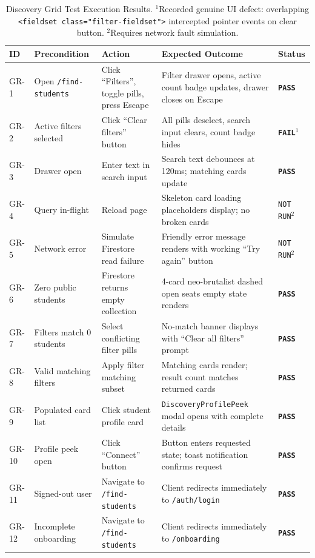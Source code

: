 \documentclass[11pt,letterpaper]{article}
\begin{document}
\begin{table}[h!]
\centering
\small
\begin{tabularx}{\textwidth}{p{1.0cm} p{2.2cm} Y Y p{1.8cm}}
\toprule
\textbf{ID} & \textbf{Precondition} & \textbf{Action} & \textbf{Expected Outcome} & \textbf{Status} \\
\midrule
GR-1 & Open \texttt{/find-students} & Click ``Filters'', toggle pills, press Escape & Filter drawer opens, active count badge updates, drawer closes on Escape & \textbf{\texttt{PASS}} \\
GR-2 & Active filters selected & Click ``Clear filters'' button & All pills deselect, search input clears, count badge hides & \textbf{\texttt{FAIL}}$^1$ \\
GR-3 & Drawer open & Enter text in search input & Search text debounces at 120ms; matching cards update & \textbf{\texttt{PASS}} \\
GR-4 & Query in-flight & Reload page & Skeleton card loading placeholders display; no broken cards & \texttt{NOT RUN}$^2$ \\
GR-5 & Network error & Simulate Firestore read failure & Friendly error message renders with working ``Try again'' button & \texttt{NOT RUN}$^2$ \\
GR-6 & Zero public students & Firestore returns empty collection & 4-card neo-brutalist dashed open seats empty state renders & \textbf{\texttt{PASS}} \\
GR-7 & Filters match 0 students & Select conflicting filter pills & No-match banner displays with ``Clear all filters'' prompt & \textbf{\texttt{PASS}} \\
GR-8 & Valid matching filters & Apply filter matching subset & Matching cards render; result count matches returned cards & \textbf{\texttt{PASS}} \\
GR-9 & Populated card list & Click student profile card & \texttt{DiscoveryProfilePeek} modal opens with complete details & \textbf{\texttt{PASS}} \\
GR-10 & Profile peek open & Click ``Connect'' button & Button enters requested state; toast notification confirms request & \textbf{\texttt{PASS}} \\
GR-11 & Signed-out user & Navigate to \texttt{/find-students} & Client redirects immediately to \texttt{/auth/login} & \textbf{\texttt{PASS}} \\
GR-12 & Incomplete onboarding & Navigate to \texttt{/find-students} & Client redirects immediately to \texttt{/onboarding} & \textbf{\texttt{PASS}} \\
\bottomrule
\end{tabularx}
\caption{Discovery Grid Test Execution Results. \footnotesize{$^1$Recorded genuine UI defect: overlapping \texttt{<fieldset class="filter-fieldset">} intercepted pointer events on clear button. $^2$Requires network fault simulation.}}
\end{table}
\end{document}
